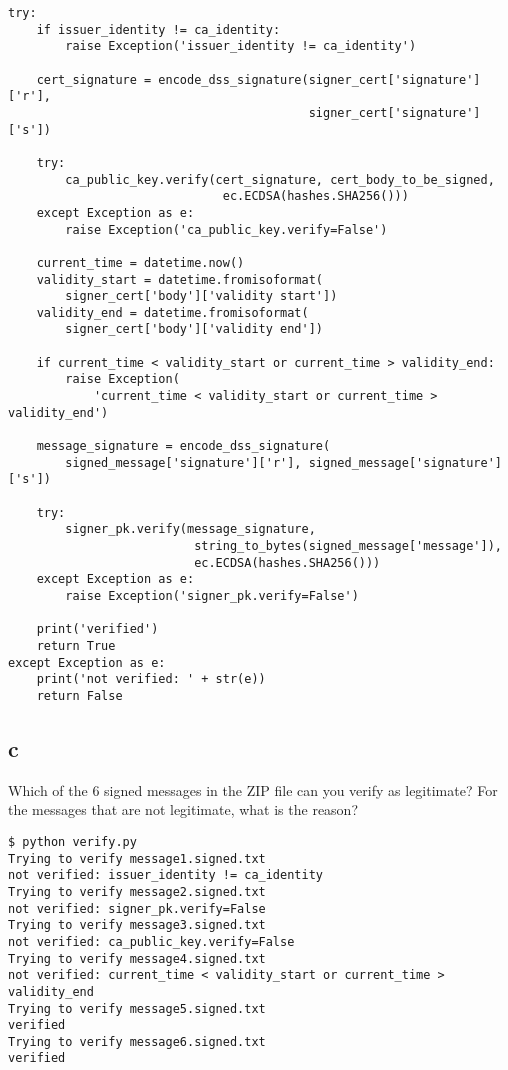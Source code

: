 \documentclass[11pt]{article}
\begin{document}
\begin{verbatim}
try:
    if issuer_identity != ca_identity:
        raise Exception('issuer_identity != ca_identity')

    cert_signature = encode_dss_signature(signer_cert['signature']['r'],
                                          signer_cert['signature']['s'])

    try:
        ca_public_key.verify(cert_signature, cert_body_to_be_signed,
                              ec.ECDSA(hashes.SHA256()))
    except Exception as e:
        raise Exception('ca_public_key.verify=False')

    current_time = datetime.now()
    validity_start = datetime.fromisoformat(
        signer_cert['body']['validity start'])
    validity_end = datetime.fromisoformat(
        signer_cert['body']['validity end'])

    if current_time < validity_start or current_time > validity_end:
        raise Exception(
            'current_time < validity_start or current_time > validity_end')

    message_signature = encode_dss_signature(
        signed_message['signature']['r'], signed_message['signature']['s'])

    try:
        signer_pk.verify(message_signature,
                          string_to_bytes(signed_message['message']),
                          ec.ECDSA(hashes.SHA256()))
    except Exception as e:
        raise Exception('signer_pk.verify=False')

    print('verified')
    return True
except Exception as e:
    print('not verified: ' + str(e))
    return False
\end{verbatim}

\subsection{c}

Which of the 6 signed messages in the ZIP file can you verify as legitimate? For the messages that are not legitimate, what is the reason?

\begin{verbatim}
$ python verify.py
Trying to verify message1.signed.txt
not verified: issuer_identity != ca_identity
Trying to verify message2.signed.txt
not verified: signer_pk.verify=False
Trying to verify message3.signed.txt
not verified: ca_public_key.verify=False
Trying to verify message4.signed.txt
not verified: current_time < validity_start or current_time > validity_end
Trying to verify message5.signed.txt
verified
Trying to verify message6.signed.txt
verified
\end{verbatim}
\end{document}
